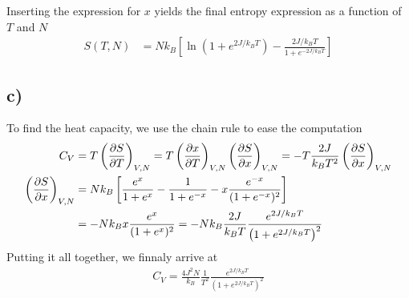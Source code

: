 \documentclass[reprint,english,notitlepage,aps,nobalancelastpage,nofootinbib]{revtex4-1}
\newcommand{\closed}[1]{\left(#1\right)}
\newcommand{\bracket}[1]{\left[#1\right]}
\newcommand{\tmdv}[4]{\closed{\pdv{#1}{#2}}_{#3,#4}}
\newcommand{\kb}{k_B}
\begin{document}
Inserting the expression for $x$ yields the final entropy expression as a function of $T$ and $N$
\begin{align}
	S(T,N) &= N\kb \bracket{\ln\closed{1+e^{2J/\kb T}} - \frac{2J/\kb T}{1+e^{-2J/\kb T}}}
\end{align}

\subsection*{c)}
To find the heat capacity, we use the chain rule to ease the computation 
\begin{align*}
	C_V &= T\tmdv{S}{T}{V}{N} = T \tmdv{x}{T}{V}{N}\tmdv{S}{x}{V}{N} = -T\frac{2J}{\kb T^2}\tmdv{S}{x}{V}{N} \\ 
	\tmdv{S}{x}{V}{N} &= N\kb \bracket{\frac{e^x}{1+e^x} - \frac{1}{1+e^{-x}} -x \frac{e^{-x}}{(1+e^{-x})^2} } \\ 
	&= - N\kb x \frac{e^x}{(1+e^x)^2} = -N\kb \frac{2J}{\kb T} \frac{e^{2J/\kb T}}{\closed{1+e^{2J/\kb T}}^2}
\end{align*}
Putting it all together, we finnaly arrive at 
\begin{align*}
	C_V = \frac{4J^2 N}{\kb} \frac{1}{T^2} \frac{e^{2J/\kb T}}{\closed{1+e^{2J/\kb T}}^2}
\end{align*}
\end{document}

